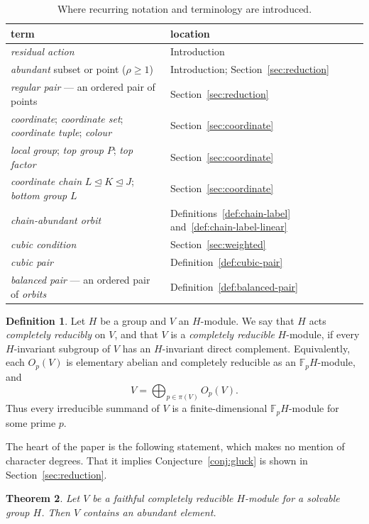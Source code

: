 \documentclass[10pt]{amsart}
\newtheorem{theorem}{Theorem}[section]
\theoremstyle{definition}
\newtheorem{definition}[theorem]{Definition}
\renewcommand{\ge}{\geqslant}
\numberwithin{equation}{section}
\numberwithin{table}{section}
\begin{document}
\begin{table}[H]
\caption{Where recurring notation and terminology are introduced.}
\label{tab:terminology}
\centering
\footnotesize
\renewcommand{\arraystretch}{1.25}
\begin{tabular}{l|l}
 term & location\\\hline
 \emph{residual action} & Introduction\\
 \emph{abundant} subset or point ($\rho\ge1$) & Introduction; Section~\ref{sec:reduction}\\
 \emph{regular pair} --- an ordered pair of points & Section~\ref{sec:reduction}\\
 \emph{coordinate}; \emph{coordinate set}; \emph{coordinate tuple};
 \emph{colour} & Section~\ref{sec:coordinate}\\
 \emph{local group}; \emph{top group} $P$; \emph{top factor} &
   Section~\ref{sec:coordinate}\\
 \emph{coordinate chain} $L\trianglelefteq K\trianglelefteq J$;
 \emph{bottom group} $L$ & Section~\ref{sec:coordinate}\\
 \emph{chain-abundant orbit} & Definitions~\ref{def:chain-label}
   and~\ref{def:chain-label-linear}\\
 \emph{cubic condition} & Section~\ref{sec:weighted}\\
 \emph{cubic pair} & Definition~\ref{def:cubic-pair}\\
 \emph{balanced pair} --- an ordered pair of \emph{orbits} &
   Definition~\ref{def:balanced-pair}
\end{tabular}
\end{table}

\begin{definition}\label{def:cr}
Let $H$ be a group and $V$ an $H$-module. We say that $H$ acts {\it completely
reducibly} on $V$, and that $V$ is a {\it completely reducible} $H$-module, if every
$H$-invariant subgroup of $V$ has an $H$-invariant direct complement. Equivalently,
each $O_p(V)$ is elementary abelian and completely reducible as an
$\mathbb{F}_pH$-module, and
$$V=\bigoplus_{p\in\pi(V)}O_p(V).$$
Thus every irreducible summand of $V$ is a finite-dimensional
$\mathbb{F}_pH$-module for some prime $p$.
\end{definition}

The heart of the paper is the following statement, which makes no mention of
character degrees. That it implies Conjecture~\ref{conj:gluck} is shown in
Section~\ref{sec:reduction}.

\begin{theorem}\label{thm:abundance-intro}
Let $V$ be a faithful completely reducible $H$-module for a solvable group $H$. Then $V$ contains an abundant element.
\end{theorem}
\end{document}
